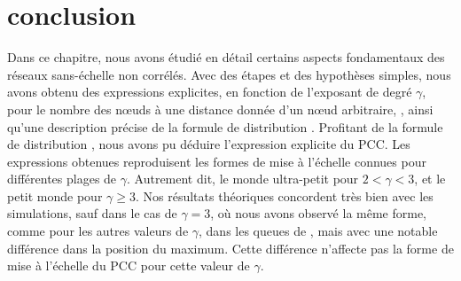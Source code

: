 \section{conclusion} 
Dans ce chapitre, nous avons étudié en détail certains aspects fondamentaux des réseaux sans-échelle non corrélés. Avec des étapes et des hypothèses simples, nous avons obtenu des expressions explicites, en fonction de l'exposant de degré $\gamma$, pour le nombre des nœuds à une distance donnée d'un nœud arbitraire, \nl\nolinebreak, ainsi qu'une description précise de la formule de distribution \nolinebreak.
Profitant de la formule de distribution \nl, nous avons pu déduire l'expression explicite du PCC. Les expressions obtenues reproduisent les formes de mise à l'échelle connues pour différentes plages de $\gamma$. Autrement dit, le monde ultra-petit pour $2<\gamma<3$, et le petit monde pour $\gamma\ge 3$. Nos résultats théoriques concordent très bien avec les simulations, sauf dans le cas de $\gamma=3$, où nous avons observé la même forme, comme pour les autres valeurs de $\gamma$, dans les queues de \nl, mais avec une notable différence dans la position du maximum. Cette différence n'affecte pas la forme de mise à l'échelle du PCC pour cette valeur de $\gamma$.
